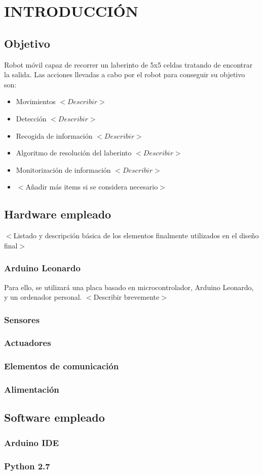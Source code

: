 
\chapter{INTRODUCCIÓN}

\section{Objetivo}
Robot móvil capaz de recorrer un laberinto de 5x5 celdas tratando de encontrar la salida. Las acciones llevadas a cabo por el robot para conseguir su objetivo son:


\begin{itemize}
  \item Movimientos $<Describir>$
  \item Detección $<Describir>$
  \item Recogida de información $<Describir>$
  \item Algoritmo de resolución del laberinto $<Describir>$
  \item Monitorización de información $<Describir>$
  \item $<$Añadir más items si se considera necesario$>$

\end{itemize}


\section{Hardware empleado}

$<$Listado y descripción básica de los elementos finalmente utilizados en el diseño final$>$


\subsection{Arduino Leonardo}

Para ello, se utilizará una placa basado en microcontrolador, Arduino Leonardo, y un ordenador personal. $<$Describir brevemente$>$

\subsection{Sensores}
\subsection{Actuadores}
\subsection{Elementos de comunicación}
\subsection{Alimentación}
\section{Software empleado}
\subsection{Arduino IDE}
\subsection{Python 2.7}

